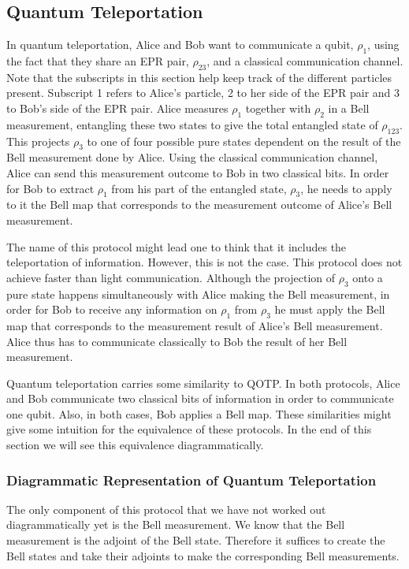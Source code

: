 \documentclass[]{article}
\begin{document}
\subsection{Quantum Teleportation}
\label{subsection:QuantumTeleportation}
In quantum teleportation, Alice and Bob want to communicate a qubit, $\rho_1$, using the fact that they share an EPR pair, $\rho_{23}$, and a classical communication channel. Note that the subscripts in this section help keep track of the different particles present. Subscript 1 refers to Alice's particle, 2 to her side of the EPR pair and 3 to Bob's side of the EPR pair. Alice measures $\rho_1$ together with $\rho_{2}$ in a Bell measurement, entangling these two states to give the total entangled state of $\rho_{123}$. This projects $\rho_{3}$ to one of four possible pure states dependent on the result of the Bell measurement done by Alice. Using the classical communication channel, Alice can send this measurement outcome to Bob in two classical bits. In order for Bob to extract  $\rho_1$ from his part of the entangled state, $\rho_{3}$, he needs to apply to it the Bell map that corresponds to the measurement outcome of Alice's Bell measurement.


The name of this protocol might lead one to think that it includes the teleportation of information. However, this is not the case. This protocol does not achieve faster than light communication. Although the projection of $\rho_{3}$ onto a pure state happens simultaneously with Alice making the Bell measurement, in order for Bob to receive any information on $\rho_1$ from $\rho_{3}$ he must apply the Bell map that corresponds to the measurement result of Alice's Bell measurement. Alice thus has to communicate classically to Bob the result of her Bell measurement.

Quantum teleportation carries some similarity to QOTP. In both protocols, Alice and Bob communicate two classical bits of information in order to communicate one qubit. Also, in both cases, Bob applies a Bell map. These similarities might give some intuition for the equivalence of these protocols. In the end of this section we will see this equivalence diagrammatically.

\subsubsection{Diagrammatic Representation of Quantum Teleportation}

The only component of this protocol that we have not worked out diagrammatically yet is the Bell measurement. We know that the Bell measurement is the adjoint of the Bell state. Therefore it suffices to create the Bell states and take their adjoints to make the corresponding Bell measurements.
\end{document}
